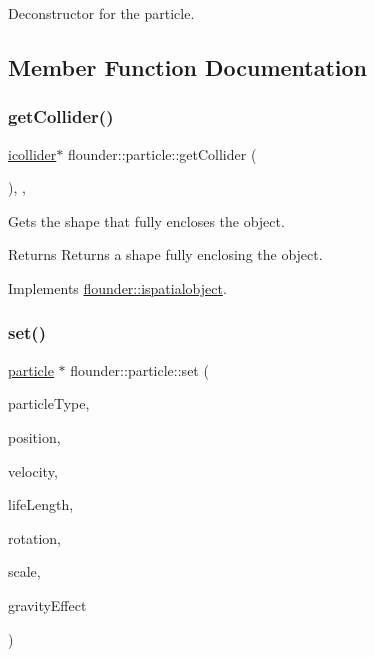 Deconstructor for the particle. 



\subsection{Member Function Documentation}
\mbox{\label{classflounder_1_1particle_a158ec50298e711488720eaf36600f828}} 
\subsubsection{\texorpdfstring{get\+Collider()}{getCollider()}}
{\footnotesize\ttfamily \hyperlink{classflounder_1_1icollider}{icollider}$\ast$ flounder\+::particle\+::get\+Collider (\begin{DoxyParamCaption}{ }\end{DoxyParamCaption})\hspace{0.3cm}{\ttfamily [inline]}, {\ttfamily [override]}, {\ttfamily [virtual]}}



Gets the shape that fully encloses the object. 

\begin{DoxyReturn}{Returns}
Returns a shape fully enclosing the object. 
\end{DoxyReturn}


Implements \hyperlink{classflounder_1_1ispatialobject_af3867cbb5f35b0296a16af77703e6c81}{flounder\+::ispatialobject}.

\mbox{\label{classflounder_1_1particle_a6572109ef15a5cd352d1a8ded68123cb}} 
\subsubsection{\texorpdfstring{set()}{set()}}
{\footnotesize\ttfamily \hyperlink{classflounder_1_1particle}{particle} $\ast$ flounder\+::particle\+::set (\begin{DoxyParamCaption}\item[{\hyperlink{classflounder_1_1particletype}{particletype} $\ast$}]{particle\+Type,  }\item[{const \hyperlink{classflounder_1_1vector3}{vector3} \&}]{position,  }\item[{const \hyperlink{classflounder_1_1vector3}{vector3} \&}]{velocity,  }\item[{const float \&}]{life\+Length,  }\item[{const float \&}]{rotation,  }\item[{const float \&}]{scale,  }\item[{const float \&}]{gravity\+Effect }\end{DoxyParamCaption})}



